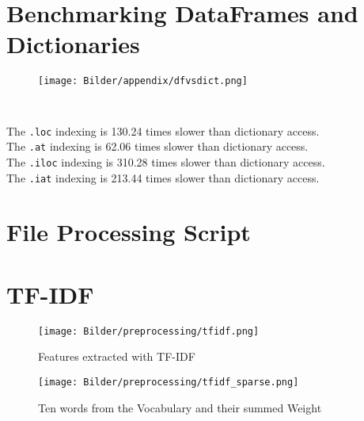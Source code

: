 \section{Benchmarking DataFrames and Dictionaries}

\label{benchmarkDF}
\begin{figure}[h!]
	\texttt{[image: Bilder/appendix/dfvsdict.png]}
	\label{fig:dbscan-plot}
\end{figure}
\begin{lstlisting}[caption={Benchmark of Indexing with Python Data Structures}]
	   
\end{lstlisting}
The \lstinline|.loc| indexing is  130.24 times slower than dictionary access.\\
The \lstinline|.at|  indexing is  62.06 times slower than dictionary access.\\
The \lstinline|.iloc|  indexing is  310.28 times slower than dictionary access.\\
The \lstinline|.iat|  indexing is  213.44 times slower than dictionary access.

\section{File Processing Script}



\section{\ac{TF-IDF}}
\label{appendix:tfidf}
\begin{figure}[]
	\centering
	\texttt{[image: Bilder/preprocessing/tfidf.png]}
	\label{fig:tfidf}
	\caption{Features extracted with TF-IDF}
\end{figure}
\begin{figure}[]
	\centering
	\texttt{[image: Bilder/preprocessing/tfidf\_sparse.png]}
	\label{fig:tfidf_sparse}
	\caption{Ten words from the Vocabulary and their summed Weight}
\end{figure}


